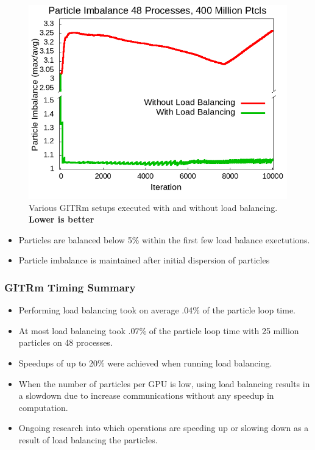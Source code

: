 \documentclass[aspectratio=169]{beamer}
\begin{document}
\begin{frame}
\begin{figure}
    \includegraphics[width=.24\textwidth]{gitrm_imb_400m_48p.png}
    \caption*{Various GITRm setups executed with and without load balancing. \bf Lower is better}
  \end{figure}
  \begin{itemize}
  \item Particles are balanced below 5\% within the first few load balance exectutions.
  \item Particle imbalance is maintained after initial dispersion of particles
  \end{itemize}
\end{frame}


\begin{frame}
  \frametitle{GITRm Timing Summary}
  \begin{itemize}
  \item Performing load balancing took on average .04\% of the particle loop time.
  \item At most load balancing took .07\% of the particle loop time with 25 million particles on  48 processes.
  \item Speedups of up to 20\% were achieved when running load balancing.
  \item When the number of particles per GPU is low, using load balancing results in a slowdown due to increase communications without any speedup in computation.
  \item Ongoing research into which operations are speeding up or slowing down as a result of load balancing the particles.
  \end{itemize}
\end{frame}
\end{document}
